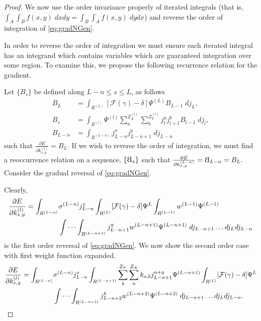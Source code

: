 \begin{proof}
  We now use the order invariance properly of iterated integrals (that is, $\int_A\int_B f(x,y)\;dxdy = \int_B\int_A f(x,y)\;dydx$) and reverse the order of integration of \eqref{eq:gradNGen}.

  In order to reverse the order of integration we must ensure each iterated integral has an integrand which contains variables which are guaranteed integration over some region. To examine this, we propose the following recurrence relation for the gradient. 

  Let $\{B_s\}$ be defined along $L -n \leq s \leq L$, as follows
  \begin{equation}
  \begin{aligned}
    B_L &= \int_{R^{(L)}} \left[\mathcal{F}(\gamma) - \delta\right] 
      \Psi^{(L)} B_{L-1} \;dj_L, \\
    B_s &= \int_{R^{(l)}} \Psi^{(l)}
     \sum_a^{Z^{(l)}_X} \sum_b^{Z^{(l)}_Y} j_l^a j_{l+1}^b B_{l-1} \; dj_l, \\
    B_{L-n} &= \int_{R^{(L-n)}} j_{L-n}^x j_{L-n+1}^y \; dj_{L-n}
  \end{aligned}
  \end{equation}
  such that $\frac{\partial E}{\partial k_{x,y}^{(l)}} = B_L$. If we wish to reverse the order of integration, we must find a reoccurrence relation on a sequence,
  $\{\rotB_s\}$  such that $\frac{\partial E}{\partial k_{x,y}^{(L-n)}} = \rotB_{L-n} = B_L.$ Consider the gradual reversal of \eqref{eq:gradNGen}.

  Clearly,
  \begin{equation} \label{eq:rev1}
  \begin{aligned}
    \frac{\partial E}{\partial k_{x,y}^{(l)}} =
      \int_{R^{(L-n)}}&  \sigma^{(L-n)} j^{x}_{L-n}
      \int_{R^{(L)}}[\mathcal{F}(\gamma)-\delta] \Psi^{L} 
      \int_{R^{(L-1)}} w^{(L-1)} \Psi^{(L-1)} \\ & 
      \idotsint_{R^{(L-n+1)}} j^{y}_{L-n+1}w^{(L-n+1)} \Psi^{(L-n+1)}  \; dj_{L-n+1}\dots dj_L dj_{L-n}
  \end{aligned}
  \end{equation} 
  is the first order reversal of \eqref{eq:gradNGen}. We now show the second order case with first weight function expanded.
  \begin{equation}\label{eq:rev2}
  \begin{aligned}
    \frac{\partial E}{\partial k_{x,y}^{(l)}} =
      \int_{R^{(L-n)}}&  \sigma^{(L-n)}  j^{x}_{L-n}
      \int_{R^{(L-n+1)}} \sum_b^{Z_Y} \sum_a^{Z_X} k_{a,b} j_{L-n+1}^{a+y} \Psi^{(L-n+1)}
      \int_{R^{(L)}}[\mathcal{F}(\gamma)-\delta] \Psi^{L} \\ & 
      \idotsint_{R^{(L-n+1)}} j^b_{L-n+2} w^{(L-n+2)} \Psi^{(L-n+2)}  \; dj_{L-n+1}\dots dj_L dj_{L-n}.
  \end{aligned}
  \end{equation}


\end{proof}
